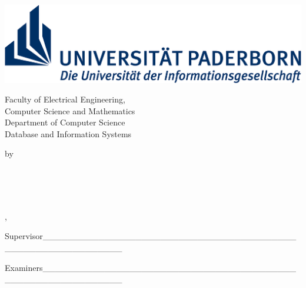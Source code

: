 \begin{titlepage}

\begin{center}   
	
\includegraphics[width=\textwidth]{__pics/uni-logo}	

\medskip

Faculty of Electrical Engineering, \\Computer Science and Mathematics\\
Department of Computer Science\\
Database and Information Systems

\medskip

\textbf{\myThesisType}

\medskip

by


\medskip

\myName\\ \myAdress\\ \myNumber\\ 

\medskip

\myLocation, \myTime

\bigskip


\bigskip\bigskip\bigskip\bigskip


	\begingroup
		\color{Maroon}\spacedallcaps{\myTitle -- \mySubTitle}

	\endgroup





\vfill

\raggedright{Supervisor\_\_\_\_\_\_\_\_\_\_\_\_\_\_\_\_\_\_\_\_\_\_\_\_\_\_\_\_\_\_\_\_\_\_\_\_\_\_\_\_\_\_\_\_\_\_\_\_\_\_\_\_\_\_\_\_\_\_\_\_}\\

\raggedleft{\mySupervisor}

\bigskip

\raggedright{Examiners\_\_\_\_\_\_\_\_\_\_\_\_\_\_\_\_\_\_\_\_\_\_\_\_\_\_\_\_\_\_\_\_\_\_\_\_\_\_\_\_\_\_\_\_\_\_\_\_\_\_\_\_\_\_\_\_\_\_\_\_}\\
\raggedleft{\myProf}\\
\raggedleft{\myOtherProf}


\end{center}  
\end{titlepage}   